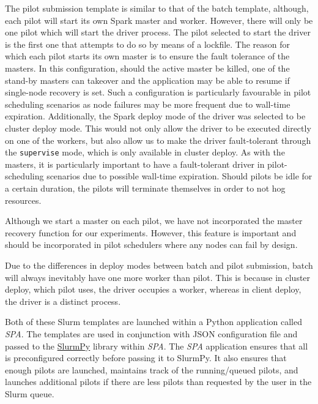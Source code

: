 \documentclass{IEEEtran}
\newcommand{\tristan}[1]{\color{red}\textbf{Note from Tristan}:
      #1 \color{black}}
\newcommand{\TG}[1]{\tristan{#1}}
\begin{document}
    The pilot submission template is similar to that of the batch template, although,
    each pilot will start its own Spark master and worker. However, there will only be one
    pilot which will start the driver process. The pilot selected to start the driver is the first one
    that attempts to do so by means of a lockfile.
    The reason for 
    which each pilot starts its own master is to ensure the fault tolerance of the 
    masters. In this configuration, should the active master be killed, one
    of the stand-by masters can takeover and the application may be able to 
    resume if single-node recovery is set. Such a configuration is particularly favourable in pilot scheduling 
    scenarios as node failures may be more frequent due to wall-time expiration.
    Additionally, the Spark deploy mode of the driver was selected to be cluster deploy mode.
    This would not only allow the driver to be executed directly on one of the workers,
    but also allow us to make the driver fault-tolerant through the
    \texttt{supervise} mode, which is only available in cluster deploy. As
    with the masters, it is particularly important to have a fault-tolerant
    driver in pilot-scheduling scenarios due to possible wall-time
    expiration.
    Should pilots be idle for a certain duration, the
    pilots will terminate themselves in order to not hog resources.

    Although we start a master on each pilot, we have not incorporated the master recovery function
    for our experiments. However, this feature is important and should be incorporated in pilot schedulers
    where any nodes can fail by design.

    Due to the differences in deploy modes between batch and pilot submission, 
    batch will always inevitably have one more worker than pilot. This is because
    in cluster deploy, which pilot uses, the driver occupies a worker, whereas in
    client deploy, the driver is a distinct process.

    Both of these Slurm templates are launched within a Python application called
    \textit{SPA}. The templates are used in conjunction with JSON configuration 
    file and passed to the \href{https://github.com/brentp/slurmpy}{SlurmPy} library within \textit{SPA}.
    The \textit{SPA} application ensures that all is preconfigured
    correctly before passing it to SlurmPy. It also ensures that enough pilots are
    launched, maintains track of the running/queued pilots, and launches additional
    pilots if there are less pilots than requested by the user in the Slurm queue.
\end{document}
